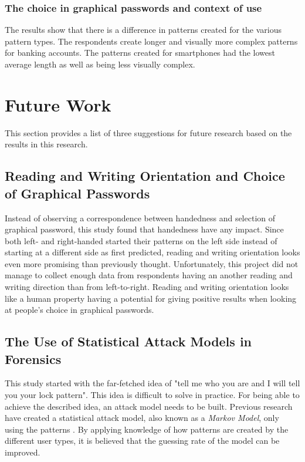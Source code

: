\subsubsection*{The choice in graphical passwords and context of use}
The results show that there is a difference in patterns created for the various pattern types. The respondents create longer and visually more complex patterns for banking accounts. The patterns created for smartphones had the lowest average length as well as being less visually complex.

  \clearpage
  \section{Future Work}\label{sec:futureWork}

    This section provides a list of three suggestions for future research based on the results in this research.

    \subsection{Reading and Writing Orientation and Choice of Graphical Passwords}
      Instead of observing a correspondence between handedness and selection of graphical password, this study found that handedness have any impact. Since both left- and right-handed started their patterns on the left side instead of starting at a different side as first predicted, reading and writing orientation looks even more promising than previously thought. Unfortunately, this project did not manage to collect enough data from respondents having an another reading and writing direction than from left-to-right. Reading and writing orientation looks like a human property having a potential for giving positive results when looking at people's choice in graphical passwords. 

    \subsection{The Use of Statistical Attack Models in Forensics}
      This study started with the far-fetched idea of "tell me who you are and I will tell you your lock pattern". This idea is difficult to solve in practice. For being able to achieve the described idea, an attack model needs to be built. Previous research have created a statistical attack model, also known as a {\it Markov Model}, only using the patterns \cite{Uellenbeck}. By applying knowledge of how patterns are created by the different user types, it is believed that the guessing rate of the model can be improved. 

